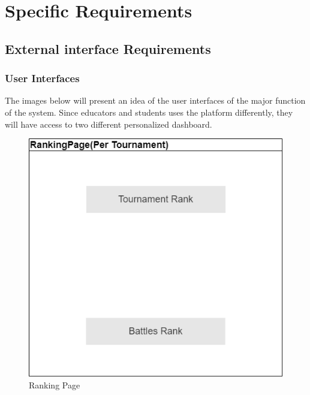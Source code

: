 \chapter{Specific Requirements}

\section{External interface Requirements}
\subsection{User Interfaces}
The images below will present an idea of the user interfaces of the major function of the system. Since educators and students uses the platform differently, they will have access to two different personalized dashboard. 
\begin{figure}[H]
        \centering
        \includegraphics[scale=0.50]{images/interfaces_3.png}
        \caption{Ranking Page}
        \label{fig:rank}
    \end{figure}
    \clearpage
